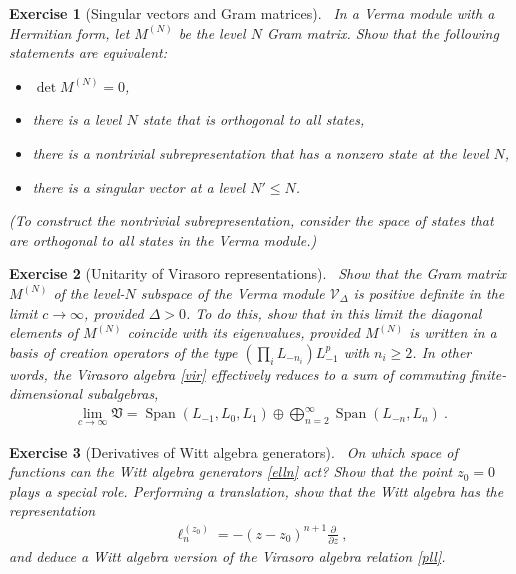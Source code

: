 \documentclass[12pt, a4paper, notitlepage, twoside]{report}
\numberwithin{equation}{section}
\theoremstyle{break}
\newtheorem{exo}{Exercise}[chapter]
\begin{document}
\begin{exo}[Singular vectors and Gram matrices]
 ~\label{exodmn}
 In a Verma module with a Hermitian form, let $M^{(N)}$ be the level $N$ Gram matrix. Show that the following statements are equivalent:
 \begin{itemize}
  \item $\det M^{(N)}=0$,
  \item there is a level $N$ state that is orthogonal to all states,
  \item there is a nontrivial subrepresentation that has a nonzero state at the level $N$,
  \item there is a singular vector at a level $N'\leq N$.
 \end{itemize}
(To construct the nontrivial subrepresentation, consider the space of states that are orthogonal to all states in the Verma module.)
\end{exo}


\begin{exo}[Unitarity of Virasoro representations]
~\label{exoun}
Show that the Gram matrix $M^{(N)}$ of the level-$N$ subspace of the Verma module $\mathcal{V}_\Delta$ is positive definite in the limit $c\to \infty$, provided  $\Delta >0$. 
To do this, show that in this limit the diagonal elements of $M^{(N)}$ coincide with its eigenvalues, provided $M^{(N)}$ is written in a basis of creation operators of the type $(\prod_i L_{-n_i}) L_{-1}^p$ with $n_i\geq 2$.
In other words, the Virasoro algebra \eqref{vir} effectively reduces to a sum of commuting finite-dimensional subalgebras, 
\begin{align}
 \underset{c\to \infty}{\lim} \mathfrak{V}  
=  \operatorname{Span}(L_{-1},L_0,L_1) \oplus \bigoplus_{n=2}^\infty \operatorname{Span} (L_{-n}, L_n)\ .
\end{align}
\end{exo}

\begin{exo}[Derivatives of Witt algebra generators]
 ~\label{exowitt}
On which space of functions can the Witt algebra generators \eqref{elln} act? 
Show that the point $z_0=0$ plays a special role. Performing a translation, show that the Witt algebra has the representation
\begin{align}
 \ell_n^{(z_0)} = -(z-z_0)^{n+1}{\frac{\partial}{\partial z}}\ ,
\end{align}
and deduce a Witt algebra version of the Virasoro algebra relation \eqref{pll}.
\end{exo}
\end{document}
